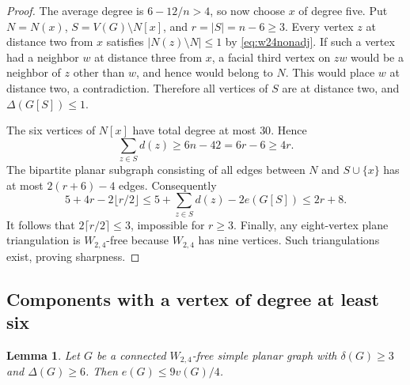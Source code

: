 \documentclass[11pt,a4paper]{article}
\newtheorem{lemma}[theorem]{Lemma}
\theoremstyle{remark}
\begin{document}
\begin{proof}
The average degree is $6-12/n>4$, so now choose $x$ of degree five.
Put $N=N(x)$, $S=V(G)\setminus N[x]$, and $r=|S|=n-6\geq3$.
Every vertex $z$ at distance two from $x$ satisfies
$|N(z)\setminus N|\leq1$ by \eqref{eq:w24nonadj}. If such a vertex had
a neighbor $w$ at distance three from $x$, a facial third vertex on $zw$
would be a neighbor of $z$ other than $w$, and hence would belong to
$N$. This would place $w$ at distance two, a contradiction. Therefore
all vertices of $S$ are at distance two, and $\Delta(G[S])\leq1$.

The six vertices of $N[x]$ have total degree at most $30$. Hence
\[
 \sum_{z\in S}d(z)\geq6n-42=6r-6\geq4r.
\]
The bipartite planar subgraph consisting of all edges between $N$ and
$S\cup\{x\}$ has at most $2(r+6)-4$ edges. Consequently
\[
 5+4r-2\lfloor r/2\rfloor
 \leq 5+\sum_{z\in S}d(z)-2e(G[S])\leq2r+8.
\]
It follows that $2\lceil r/2\rceil\leq3$, impossible for $r\geq3$.
Finally, any eight-vertex plane triangulation is $W_{2,4}$-free because
$W_{2,4}$ has nine vertices. Such triangulations exist, proving sharpness.
\end{proof}

\subsection{Components with a vertex of degree at least six}

\begin{lemma}\label{lem:w24large}
Let $G$ be a connected $W_{2,4}$-free simple planar graph with
$\delta(G)\geq3$ and $\Delta(G)\geq6$. Then $e(G)\leq9v(G)/4$.
\end{lemma}
\end{document}
